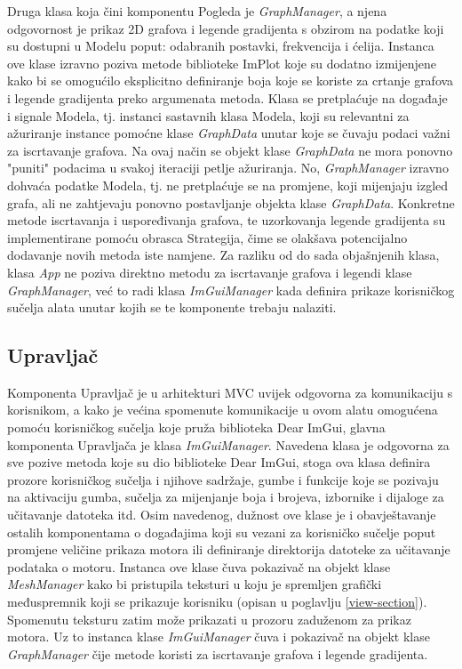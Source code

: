 \documentclass[times, utf8, diplomski]{fer}
\begin{document}
Druga klasa koja čini komponentu Pogleda je \textit{GraphManager}, a njena odgovornost je prikaz 2D grafova i legende gradijenta s obzirom na podatke koji su dostupni u Modelu poput: odabranih postavki, frekvencija i ćelija. Instanca ove klase izravno poziva metode biblioteke ImPlot koje su dodatno izmijenjene kako bi se omogućilo eksplicitno definiranje boja koje se koriste za crtanje grafova i legende gradijenta preko argumenata metoda. Klasa se pretplaćuje na događaje i signale Modela, tj. instanci sastavnih klasa Modela, koji su relevantni za ažuriranje instance pomoćne klase \textit{GraphData} unutar koje se čuvaju podaci važni za iscrtavanje grafova. Na ovaj način se objekt klase \textit{GraphData} ne mora ponovno "puniti" podacima u svakoj iteraciji petlje ažuriranja. No, \textit{GraphManager} izravno dohvaća podatke Modela, tj. ne pretplaćuje se na promjene, koji mijenjaju izgled grafa, ali ne zahtjevaju ponovno postavljanje objekta klase \textit{GraphData}. Konkretne metode iscrtavanja i uspoređivanja grafova, te uzorkovanja legende gradijenta su implementirane pomoću obrasca Strategija, čime se olakšava potencijalno dodavanje novih metoda iste namjene. Za razliku od do sada objašnjenih klasa, klasa \textit{App} ne poziva direktno metodu za iscrtavanje grafova i legendi klase \textit{GraphManager}, već to radi klasa \textit{ImGuiManager} kada definira prikaze korisničkog sučelja alata unutar kojih se te komponente trebaju nalaziti.\\

\subsection{Upravljač}

Komponenta Upravljač je u arhitekturi MVC uvijek odgovorna za komunikaciju s korisnikom, a kako je većina spomenute komunikacije u ovom alatu omogućena pomoću korisničkog sučelja koje pruža biblioteka Dear ImGui, glavna komponenta Upravljača je klasa \textit{ImGuiManager}. Navedena klasa je odgovorna za sve pozive metoda koje su dio biblioteke Dear ImGui, stoga ova klasa definira prozore korisničkog sučelja i njihove sadržaje, gumbe i funkcije koje se pozivaju na aktivaciju gumba, sučelja za mijenjanje boja i brojeva, izbornike i dijaloge za učitavanje datoteka itd. Osim navedenog, dužnost ove klase je i obavještavanje ostalih komponentama o događajima koji su vezani za korisničko sučelje poput promjene veličine prikaza motora ili definiranje direktorija datoteke za učitavanje podataka o motoru. Instanca ove klase čuva pokazivač na objekt klase \textit{MeshManager} kako bi pristupila teksturi u koju je spremljen grafički međuspremnik koji se prikazuje korisniku (opisan u poglavlju \ref{view-section}). Spomenutu teksturu zatim može prikazati u prozoru zaduženom za prikaz motora. Uz to instanca klase \textit{ImGuiManager} čuva i pokazivač na objekt klase \textit{GraphManager} čije metode koristi za iscrtavanje grafova i legende gradijenta.\\
\end{document}
